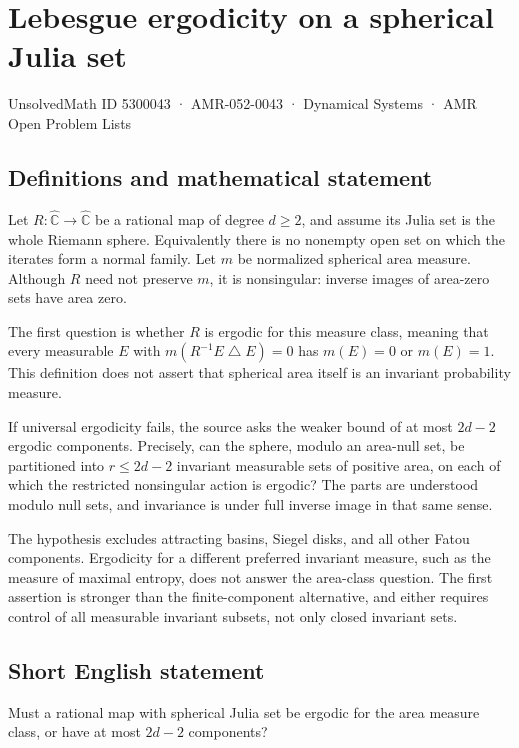 \documentclass[11pt,a4paper]{article}
\begin{document}
\section*{Lebesgue ergodicity on a spherical Julia set}\label{5300043}
{\small UnsolvedMath ID 5300043 · AMR-052-0043 · Dynamical Systems · AMR Open Problem Lists}
\subsection{Definitions and mathematical statement}
Let $R:\widehat{\mathbb C}\to\widehat{\mathbb C}$ be a rational map of
degree $d\ge2$, and assume its Julia set is the whole Riemann sphere.
Equivalently there is no nonempty open set on which the iterates form
a normal family. Let $m$ be normalized spherical area measure.
Although $R$ need not preserve $m$, it is nonsingular: inverse images
of area-zero sets have area zero.

The first question is whether $R$ is ergodic for this measure class,
meaning that every measurable $E$ with
$m(R^{-1}E\mathbin{\triangle} E)=0$ has $m(E)=0$ or $m(E)=1$.
This definition does not assert that spherical area itself is an
invariant probability measure.

If universal ergodicity fails, the source asks the weaker bound of
at most $2d-2$ ergodic components. Precisely, can the sphere, modulo
an area-null set, be partitioned into $r\le2d-2$ invariant measurable
sets of positive area, on each of which the restricted nonsingular
action is ergodic? The parts are understood modulo null sets, and
invariance is under full inverse image in that same sense.

The hypothesis excludes attracting basins, Siegel disks, and all other
Fatou components. Ergodicity for a different preferred invariant
measure, such as the measure of maximal entropy, does not answer
the area-class question. The first assertion is stronger than the
finite-component alternative, and either requires control of all
measurable invariant subsets, not only closed invariant sets.
\subsection{Short English statement}
Must a rational map with spherical Julia set be ergodic for the area measure class, or have at most $2d-2$ components?
\end{document}

